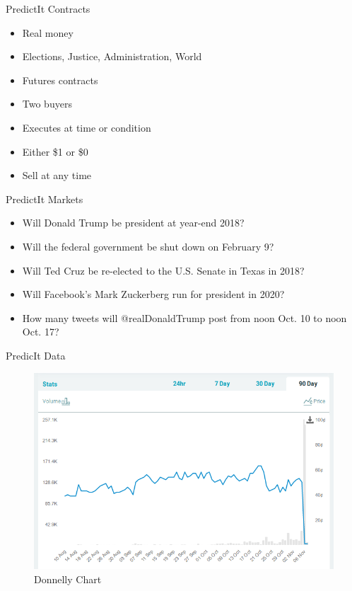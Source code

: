 \documentclass[ignorenonframetext,]{beamer}
\providecommand{\tightlist}{%
  \setlength{\itemsep}{0pt}\setlength{\parskip}{0pt}}
\begin{document}
\begin{frame}{PredictIt Contracts}

\begin{itemize}
\tightlist
\item
  Real money
\item
  Elections, Justice, Administration, World
\item
  Futures contracts
\item
  Two buyers
\item
  Executes at time or condition
\item
  Either \$1 or \$0
\item
  Sell at any time
\end{itemize}

\end{frame}

\begin{frame}{PredictIt Markets}

\begin{itemize}
\tightlist
\item
  Will Donald Trump be president at year-end 2018?
\item
  Will the federal government be shut down on February 9?
\item
  Will Ted Cruz be re-elected to the U.S. Senate in Texas in 2018?
\item
  Will Facebook's Mark Zuckerberg run for president in 2020?
\item
  How many tweets will @realDonaldTrump post from noon Oct. 10 to noon
  Oct. 17?
\end{itemize}

\end{frame}

\begin{frame}{PredicIt Data}

\begin{figure}
\centering
\includegraphics{donnelly_graph.png}
\caption{Donnelly Chart}
\end{figure}

\end{frame}
\end{document}
